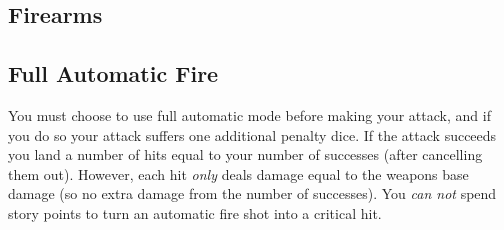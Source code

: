\vspace{\baselineskip}

\subsection{Firearms}

\subsection{Full Automatic Fire}
You must choose to use full automatic mode before making your attack,
and if you do so your attack suffers one additional penalty dice.
If the attack succeeds you land a number of hits equal to your number of successes (after cancelling them out).
However, each hit \textit{only} deals damage equal to the weapons base damage (so no extra damage from the number of successes).    
You \textit{can not} spend story points to turn an automatic fire shot into a critical hit.

